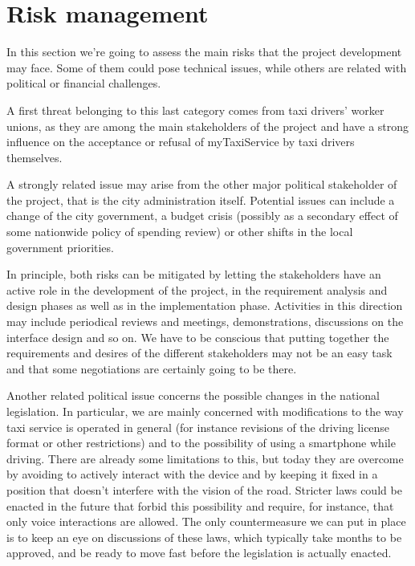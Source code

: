 \chapter{Risk management}
In this section we're going to assess the main risks that the project development may face. Some of them could pose technical issues, while others are related with political or financial challenges.

A first threat belonging to this last category comes from taxi drivers' worker unions, as they are among the main stakeholders of the project and have a strong influence on the acceptance or refusal of myTaxiService by taxi drivers themselves. 

A strongly related issue may arise from the other major political stakeholder of the project, that is the city administration itself. Potential issues can include a change of the city government, a budget crisis (possibly as a secondary effect of some nationwide policy of spending review) or other shifts in the local government priorities. 

In principle, both risks can be mitigated by letting the stakeholders have an active role in the development of the project, in the requirement analysis and design phases as well as in the implementation phase. Activities in this direction may include periodical reviews and meetings, demonstrations, discussions on the interface design and so on. We have to be conscious that putting together the requirements and desires of the different stakeholders may not be an easy task and that some negotiations are certainly going to be there.

Another related political issue concerns the possible changes in the national legislation. In particular, we are mainly concerned with modifications to the way taxi service is operated in general (for instance revisions of the driving license format or other restrictions) and to the possibility of using a smartphone while driving. There are already some limitations to this, but today they are overcome by avoiding to actively interact with the device and by keeping it fixed in a position that doesn't interfere with the vision of the road. Stricter laws could be enacted in the future that forbid this possibility and require, for instance, that only voice interactions are allowed. The only countermeasure we can put in place is to keep an eye on discussions of these laws, which typically take months to be approved, and be ready to move fast before the legislation is actually enacted.

